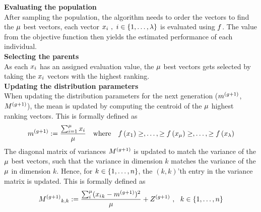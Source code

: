 \textbf{Evaluating the population}\\
After sampling the population, the algorithm needs to order the vectors to find the $\mu$ best vectors, each vector $x_{i}\ ,\ i \in \{1, \dots, \lambda\}$ is evaluated using $f$. 
The value from the objective function then yields 
the estimated performance of each individual.
\\

\textbf{Selecting the parents}\\
As each $x_{i}$ has an assigned evaluation value, the 
$\mu$ best vectors gets selected by 
taking the $x_{i}$ vectors with the highest ranking.
\\

\textbf{Updating the distribution parameters}\\
When updating the distribution parameters for the next generation
($m^{(g + 1)}$,$M^{(g + 1)}$), 
the mean is updated by computing the centroid of the 
$\mu$ highest ranking vectors. This is formally defined as
\begin{align}
\mean^{(\generation +1)}:=\frac{\sum_{i=1}^{\offspringNumber} \individual_{i}}{\offspringNumber}
\ \ \ 
\text{where}
\ \ \ 
\fitnessFunction \left( \individual_{1} \right) \geq, \dots, 
\geq \fitnessFunction \left( \individual_{\offspringNumber} \right) \geq, 
\dots, \geq \fitnessFunction \left( \individual_{\populationSize} \right)
\end{align}
The diagonal matrix of variances $M^{(g + 1)}$ is updated 
to match the variance of the $\mu$ best
vectors, such that the variance in dimension $k$ 
matches the variance of the $\mu$
in dimension $k$. Hence, for $k \in \{ 1,\dots,n \}$,
the $(k,k)$'th entry in the variance matrix is 
updated. 
This is formally defined as
\begin{align}
{M^{(g+1)}}_{k,k}:=\frac{\sum_{i}^{\mu}
({x_{i}}_k - m^{(g +1)})^2}{\mu} + 
Z^{(g + 1)}\ ,\ \ k \in \{ 1,\dots,n \}
\end{align}